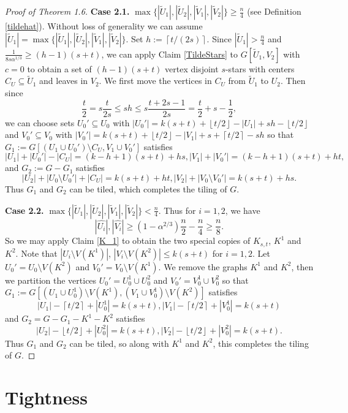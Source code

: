 \documentclass[oneside,12pt]{memoir}
\newcommand{\floor}[1]{\left\lfloor#1\right\rfloor}
\newcommand{\ceiling}[1]{\left\lceil#1\right\rceil}
\begin{document}
\begin{proof}[Proof of Theorem 1.6]
\textbf{Case 2.1.} $\max\{|\tilde{U}_1|, |\tilde{U}_2|, |\tilde{V}_1|, |\tilde{V}_2|\}\geq \frac{n}{4}$ (see Definition \ref{tildehat}).  Without loss of generality we can assume $|\tilde{U}_1|=\max\{|\tilde{U}_1|, |\tilde{U}_2|, |\tilde{V}_1|, |\tilde{V}_2|\}$.    
Set $h:=\ceiling{t/(2s)}$. Since $|\tilde{U}_1|>\frac{n}{4}$ and $\frac{1}{8s\alpha^{1/3}}\geq (h-1)(s+t)$, we can apply Claim \ref{TildeStars} to $G[\tilde{U}_1, V_2]$ with $c=0$ to obtain a set of $(h-1)(s+t)$ vertex disjoint $s$-stars with centers $C_U\subseteq \tilde{U}_1$ and leaves in $V_2$. We first move the vertices in $C_U$ from $\tilde{U}_1$ to $U_2$.  Then since $$\frac{t}{2}=s\frac{t}{2s}\leq sh\leq s\frac{t+2s-1}{2s}=\frac{t}{2}+s-\frac{1}{2},$$ we can choose sets $U_0'\subseteq U_0$ with $|U_0'|=k(s+t)+\floor{t/2}-|U_1|+sh-\floor{t/2}$ and $V_0'\subseteq V_0$ with $|V_0'|=k(s+t)+\floor{t/2}-|V_1|+s+\ceiling{t/2}-sh$ so that $G_1:=G[(U_1\cup U_0')\setminus C_U, V_1\cup V_0']$ satisfies $$|U_1|+|U_0'|-|C_U|=(k-h+1)(s+t)+hs, |V_1|+|V_0'|=(k-h+1)(s+t)+ht,$$
and $G_2:=G-G_1$ satisfies $$|U_2|+|U_0\setminus U_0'|+|C_U|=k(s+t)+ht, |V_2|+|V_0\setminus V_0'|= k(s+t)+hs.$$  Thus $G_1$ and $G_2$ can be tiled, which completes the tiling of $G$.

\textbf{Case 2.2.} $\max\{|\tilde{U}_1|, |\tilde{U}_2|, |\tilde{V}_1|, |\tilde{V}_2|\}< \frac{n}{4}$.  Thus for $i=1,2$, we have $$|\hat{U_i}|, |\hat{V_i}|\geq (1-\alpha^{2/3})\frac{n}{2}-\frac{n}{4}\geq \frac{n}{8}.$$  So we may apply Claim \ref{K_1} to obtain the two special copies of $K_{s,t}$, $K^1$ and $K^2$.  Note that $|U_i\setminus V(K^1)|$, $|V_i\setminus V(K^2)|\leq k(s+t)$ for $i=1,2$.  Let $U_0'=U_0\setminus V(K^2)$ and $V_0'=V_0\setminus V(K^1)$.  We remove the graphs $K^1$ and $K^2$, then we partition the vertices $U_0'=U_0^1\cup U_0^2$ and $V_0'=V_0^1\cup V_0^2$ so that $G_1:=G[(U_1\cup U_0^1)\setminus V(K^1), (V_1\cup V_0^1)\setminus V(K^2)]$ satisfies $$|U_1|-\ceiling{t/2}+|U_0^1|=k(s+t), |V_1|-\ceiling{t/2}+|V_0^1|=k(s+t)$$ and $G_2=G-G_1-K^1-K^2$ satisfies $$|U_2|-\floor{t/2}+|U_0^2|=k(s+t), |V_2|-\floor{t/2}+|V_0^2|=k(s+t).$$  Thus $G_1$ and $G_2$ can be tiled, so along with $K^1$ and $K^2$, this completes the tiling of $G$.

\end{proof}

\section{Tightness}
\label{lower bound}
\end{document}

